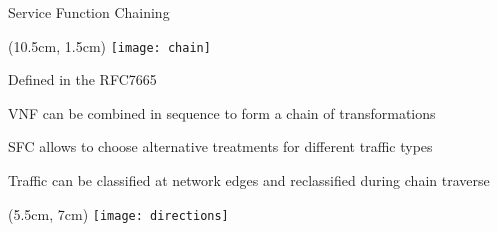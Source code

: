 \begin{frame}{Service Function Chaining}

  \begin{textblock*}{1cm}(10.5cm, 1.5cm)
    \texttt{[image: chain]}
  \end{textblock*}

  Defined in the RFC7665

  \vspace{0.46cm}

  VNF can be combined in sequence to form a chain of transformations

  \vspace{0.46cm}

  SFC allows to choose alternative treatments for different traffic types

  \vspace{0.46cm}

  Traffic can be classified at network edges and reclassified during chain
  traverse

  \begin{textblock*}{1cm}(5.5cm, 7cm)
    \texttt{[image: directions]}
  \end{textblock*}

\end{frame}